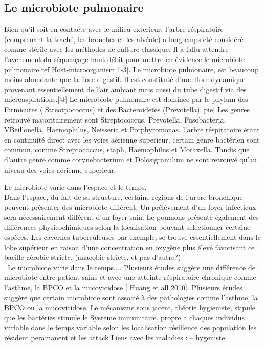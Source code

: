 \documentclass[12pt,a4paper]{article}
\begin{document}
\subsection{Le microbiote pulmonaire}

Bien qu’il soit en contacte avec le milieu exterieur, l’arbre réspiratoire (comprenant la traché, les bronches et les alvéole) a longtemps été considéré comme stérile avec les méthodes de culture classique. Il a fallu attendre l’avenement du séquençage haut débit pour mettre en évidence le microbiote pulmonaire[ref Host-microorganism 1-3].
Le microbiote pulmonaire, est beaucoup moins abondante que la flore digestif. Il est constituté d’une flore dynamique provenant essentiellement de l’air ambiant mais aussi du tube digestif via des microaspirations.[@]
Le microbiote pulmonaire est dominée par le phylum des Firmicutes ( Streotpococcus) et des Bacteroidetes (Prevotella).[pie] Les genres retrouvé majoritairement sont Streptococcus, Prevotella, Fusobacteria, VBeillonella, Haemophilus, Neisseria et Porphyromonas.
l’arbre réspiratoire étant en continuité direct avec les voies aérienne superieur, certain genre bactérien sont commun, comme Streptococcus, staph, Haemophilus et Moraxella. Tandis que d’autre genre comme corynebacterium et Dolosigranulum ne sont retrouvé qu’au niveau des voies aérienne superieur.

Le microbiote varie dans l’espace et le temps. \\
Dans l’espace, du fait de sa structure, certaine régions de l'arbre bronchique peuvent présenter des microbiote différent. Un prélèvement d'un foyer infectieux sera nécessairement différent d'un foyer sain. Le poumons présente également des différences physicochimiques selon la localisation pouvant selectionner certaine espèces. Les cavernes tuberculeuses par exemple, se trouve essentiellement dans le lobe supérieur en raison d'une concentration en oxygène plus élevé favorisant ce bacille aérobie stricte. (anaeobie stricte, et pas d’autre?)\\\
Le microbiote varie dans le temps.... 
Plusieurs études suggère une différence de microbiote entre patient sains et avec une atteinte réspiratoire chronique comme l’asthme, la BPCO et la mucovicidose [ Huang et all 2010].
Plusieurs études suggère que certain microbiote sont associé à des pathologies comme l’asthme, la BPCO ou la mucovicidose. Le mécanisme sous jacent, théorie hygieniste, stipule que les bactéries stimule le Systeme immunitaire.
propre a chaques individus
variable dans le temps
variable selon les localisation
résilience des population
les résident peramanent et les attack
Liens avec les maladies :
– hygeniste
\end{document}

